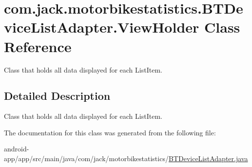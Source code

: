 \hypertarget{classcom_1_1jack_1_1motorbikestatistics_1_1_b_t_device_list_adapter_1_1_view_holder}{}\section{com.\+jack.\+motorbikestatistics.\+B\+T\+Device\+List\+Adapter.\+View\+Holder Class Reference}
\label{classcom_1_1jack_1_1motorbikestatistics_1_1_b_t_device_list_adapter_1_1_view_holder}


Class that holds all data displayed for each List\+Item.  




\subsection{Detailed Description}
Class that holds all data displayed for each List\+Item. 

The documentation for this class was generated from the following file\+:\begin{DoxyCompactItemize}
\item 
android-\/app/app/src/main/java/com/jack/motorbikestatistics/\hyperlink{_b_t_device_list_adapter_8java}{B\+T\+Device\+List\+Adapter.\+java}\end{DoxyCompactItemize}
